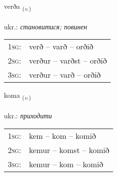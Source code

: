 \documentclass[frontgrid, backgrid]{flacards}\usepackage[]{graphicx}\usepackage[]{xcolor}
\begin{document}
\renewcommand{\flhead}{\vskip5pt \fboxsep=0pt {\small\bfseries\footnotesize Sagnorð | дієслово}}
\renewcommand{\fcfoot}{\vskip5pt \fboxsep=0pt \hspace{2pt}{\small\bfseries\footnotesize 1K}}

\renewcommand{\blhead}{\vskip5pt {\small\bfseries\footnotesize Sagnorð | дієслово }}
\renewcommand{\bcfoot}{\vskip5pt \hspace{2pt}{\small\bfseries\footnotesize 1K}}


{verða \small{\textsubscript{(\textit{v.})}} \\[1ex] %
\textphonetic{[vɛrða]} \\
ukr.: \emph{становитися; повинен} \\  [2ex]
\renewcommand*{\arraystretch}{0.8}
\begin{tabular}{p{1cm}l}
\textsc{1sg}: & verð -- varð -- orðið \\ 
\textsc{2sg}: & verður -- varðst -- orðið \\ 
\textsc{3sg}: & verður -- varð -- orðið \\ 
\end{tabular}
}

\renewcommand{\flhead}{\vskip5pt \fboxsep=0pt {\small\bfseries\footnotesize Sagnorð | дієслово}}
\renewcommand{\fcfoot}{\vskip5pt \fboxsep=0pt \hspace{2pt}{\small\bfseries\footnotesize 1K}}

\renewcommand{\blhead}{\vskip5pt {\small\bfseries\footnotesize Sagnorð | дієслово }}
\renewcommand{\bcfoot}{\vskip5pt \hspace{2pt}{\small\bfseries\footnotesize 1K}}


{koma \small{\textsubscript{(\textit{v.})}} \\[1ex] %
\textphonetic{[kʰɔːma]} \\
ukr.: \emph{приходити} \\  [2ex]
\renewcommand*{\arraystretch}{0.8}
\begin{tabular}{p{1cm}l}
\textsc{1sg}: & kem -- kom -- komið \\ 
\textsc{2sg}: & kemur -- komst -- komið \\ 
\textsc{3sg}: & kemur -- kom -- komið \\ 
\end{tabular}
}
\end{document}
